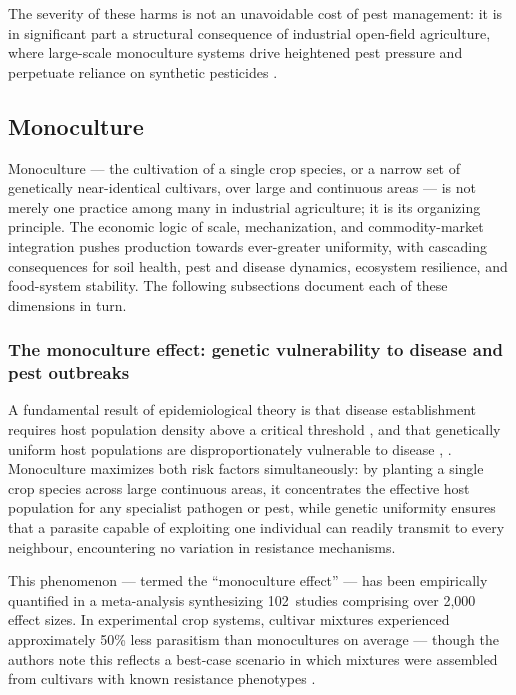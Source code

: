 The severity of these harms is not an unavoidable cost of pest management: it is in significant part a structural consequence of industrial open-field agriculture, where large-scale monoculture systems drive heightened pest pressure and perpetuate reliance on synthetic pesticides \cite[p.~1]{belmain2022agroecological}.

\subsection{Monoculture}

Monoculture --- the cultivation of a single crop species, or a narrow set of genetically near-identical cultivars, over large and continuous areas --- is not merely one practice among many in industrial agriculture; it is its organizing principle. The economic logic of scale, mechanization, and commodity-market integration pushes production towards ever-greater uniformity, with cascading consequences for soil health, pest and disease dynamics, ecosystem resilience, and food-system stability. The following subsections document each of these dimensions in turn.


\subsubsection{The monoculture effect: genetic vulnerability to disease and pest outbreaks}
\label{sec:monoculture-effect}

A fundamental result of epidemiological theory is that disease establishment requires host population density above a critical threshold \cite[Section~1, pp.~535--536]{anderson1986invasion}, and that genetically uniform host populations are disproportionately vulnerable to disease \cite[pp.~381--382]{mundt2002multiline}, \cite[p.~718]{zhu2000genetic}. Monoculture maximizes both risk factors simultaneously: by planting a single crop species across large continuous areas, it concentrates the effective host population for any specialist pathogen or pest, while genetic uniformity ensures that a parasite capable of exploiting one individual can readily transmit to every neighbour, encountering no variation in resistance mechanisms.

This phenomenon --- termed the ``monoculture effect'' --- has been empirically quantified in a meta-analysis synthesizing 102~studies comprising over 2,000 effect sizes. In experimental crop systems, cultivar mixtures experienced approximately 50\% less parasitism than monocultures on average --- though the authors note this reflects a best-case scenario in which mixtures were assembled from cultivars with known resistance phenotypes \cite[pp.~21,~23,~26]{gibson2021genetic}.

